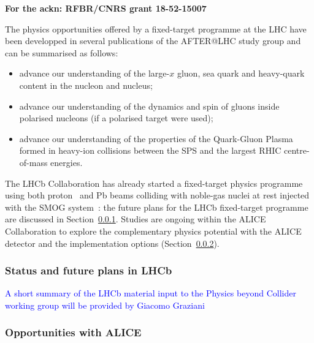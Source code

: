 \documentclass[../report.tex]{subfiles}
\begin{document}
{\bf For the ackn: RFBR/CNRS grant 18-52-15007}

The physics opportunities offered by a fixed-target programme at the LHC have been developped in several publications of the AFTER@LHC study group \cite{Brodsky:2012vg, Lansberg:Adv2015} and can be summarised as follows:
\begin{itemize}
\item advance our understanding of the large-$x$ gluon, sea quark and heavy-quark content in the nucleon and nucleus;
\item advance our understanding of the dynamics and spin of gluons inside polarised nucleons (if a polarised target were used);
\item advance our understanding of the properties of the Quark-Gluon Plasma formed in heavy-ion collisions between the SPS and the largest RHIC centre-of-mass energies.
\end{itemize}
The LHCb Collaboration has already started a fixed-target physics programme using both proton~\cite{Aaij:2018svt,Aaij:2018ogq} and Pb beams colliding with noble-gas nuclei at rest injected with the SMOG system~\cite{SMOG}: the future plans for the LHCb fixed-target programme are discussed in Section~\ref{sec:FTLHCb}. Studies are ongoing within the ALICE Collaboration to explore the complementary physics potential with the ALICE detector and the implementation options (Section~\ref{sec:FTALICE}). 

\subsubsection{Status and future plans in LHCb}
\label{sec:FTLHCb}

\textcolor{blue}{A short summary of the LHCb material input to the Physics beyond Collider working group will be provided by Giacomo Graziani}

\subsubsection{Opportunities with ALICE}
\label{sec:FTALICE}
\end{document}
